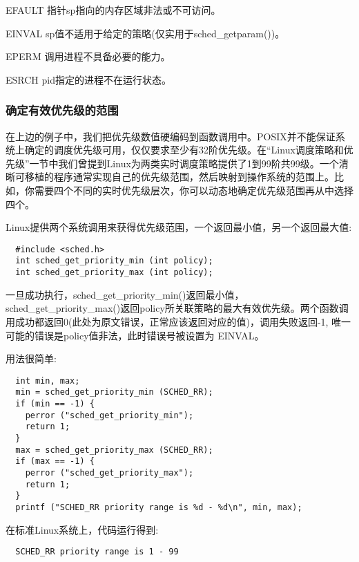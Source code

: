\begin{eqlist*}
\item[EFAULT] 指针sp指向的内存区域非法或不可访问。
\item[EINVAL] sp值不适用于给定的策略(仅实用于sched\_getparam())。
\item[EPERM] 调用进程不具备必要的能力。
\item[ESRCH] pid指定的进程不在运行状态。
\end{eqlist*}

\subsubsection{确定有效优先级的范围}

  在上边的例子中，我们把优先级数值硬编码到函数调用中。POSIX并不能保证系统上确定的调度优先级可用，仅仅要求至少有32阶优先级。在“Linux调度策略和优先级”一节中我们曾提到Linux为两类实时调度策略提供了1到99阶共99级。一个清晰可移植的程序通常实现自己的优先级范围，然后映射到操作系统的范围上。比如，你需要四个不同的实时优先级层次，你可以动态地确定优先级范围再从中选择四个。

  Linux提供两个系统调用来获得优先级范围，一个返回最小值，另一个返回最大值:

\begin{lstlisting}
  #include <sched.h>
  int sched_get_priority_min (int policy);
  int sched_get_priority_max (int policy);
\end{lstlisting}

  一旦成功执行，sched\_get\_priority\_min()返回最小值，sched\_get\_priority\_max()返回policy所关联策略的最大有效优先级。两个函数调用成功都返回0(此处为原文错误，正常应该返回对应的值)，调用失败返回-1, 唯一可能的错误是policy值非法，此时错误号被设置为 EINVAL。

  用法很简单:

\begin{lstlisting}
  int min, max;
  min = sched_get_priority_min (SCHED_RR);
  if (min == -1) {
    perror ("sched_get_priority_min");
    return 1;
  }
  max = sched_get_priority_max (SCHED_RR);
  if (max == -1) {
    perror ("sched_get_priority_max");
    return 1;
  }
  printf ("SCHED_RR priority range is %d - %d\n", min, max);
\end{lstlisting}

  在标准Linux系统上，代码运行得到:

\begin{verbatim}
  SCHED_RR priority range is 1 - 99
\end{verbatim}


